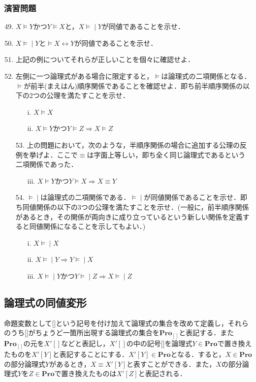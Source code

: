 \documentclass{ltjsarticle}
\theoremstyle{mystyle1}
\theoremstyle{mystyle3}
\theoremstyle{mystyle2}
\newcommand{\bPro}{\ensuremath{\mathbf{Pro}}}
\newcommand{\lequiv}{\ensuremath{\models\!\mid}}
\begin{document}
\subsubsection*{演習問題}
\begin{enumerate}
  \setcounter{enumi}{48}
  \item $X\models Y$かつ$Y\models X$と，$X\lequiv Y$が同値であることを示せ．
  \item $X\lequiv Y$と$\models X\leftrightarrow Y$が同値であることを示せ．
  \item 上記の例についてそれらが正しいことを個々に確認せよ．
  \item 左側に一つ論理式がある場合に限定すると，$\models$は論理式の二項関係となる．$\models$が前半(まえはん)順序関係であることを確認せよ．即ち前半順序関係の以下の2つの公理を満たすことを示せ．\begin{enumerate}
          \item[i.] $X\models X$
          \item[ii.] $X\models Y$かつ$Y\models Z\Rightarrow X\models Z$
        \end{enumerate}
  \item[53.] 上の問題において，次のような，半順序関係の場合に追加する公理の反例を挙げよ．ここで$\equiv$は字面上等しい，即ち全く同じ論理式であるという二項関係であった．\begin{enumerate}
          \item[iii.] $X\models Y$かつ$Y\models X\Rightarrow X\equiv Y$
        \end{enumerate}
  \item[54.] $\lequiv$は論理式の二項関係である．$\lequiv$が同値関係であることを示せ．即ち同値関係の以下の3つの公理を満たすことを示せ．(一般に，前半順序関係があるとき，その関係が両向きに成り立っているという新しい関係を定義すると同値関係になることを示してもよい．)\begin{enumerate}
          \item[i.] $X\lequiv X$
          \item[ii.] $X\lequiv Y\Rightarrow Y\lequiv X$
          \item[iii.] $X\lequiv Y$かつ$Y\lequiv Z\Rightarrow X\lequiv Z$
        \end{enumerate}
\end{enumerate}
\subsection{論理式の同値変形}
命題変数として[]という記号を付け加えて論理式の集合を改めて定義し，それらのうち[]がちょうど一箇所出現する論理式の集合を$\bPro_{[]}$と表記する．また$\bPro_{[]}$の元を$X'[]$などと表記し，$X'[]$の中の記号[]を論理式$Y\in\bPro$で置き換えたものを$X'[Y]$と表記することにする．$X'[Y]\in\bPro$となる．すると，$X\in\bPro$の部分論理式$Y$があるとき，$X \equiv X'[Y]$と表すことができる．また，$X$の部分論理式$Y$を$Z\in\bPro$で置き換えたものは$X'[Z]$と表記される．
\end{document}
